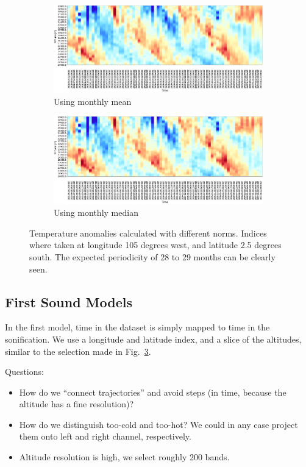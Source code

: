\documentclass[11pt,a4paper]{article}
\newcommand{\figref}[1]{Fig.~\ref{#1}}
\begin{document}
\begin{figure}
\begin{subfigure}[b]{1.0\textwidth}%
\centering
\includegraphics[scale=0.45,trim=2mm 0 1mm 1mm]{figures/ta_anomalies_mean.jpg}
\caption{Using monthly mean}
\label{fig:anomaly-mean}
\end{subfigure}
\begin{subfigure}[b]{1.0\textwidth}%
\centering
\includegraphics[scale=0.45,trim=2mm 0 1mm -4mm]{figures/ta_anomalies_median.jpg}
\caption{Using monthly median}
\label{fig:anomaly-median}
\end{subfigure}
\caption{Temperature anomalies calculated with different norms. Indices where taken at longitude 105 degrees west, and latitude 2.5 degrees south. The expected periodicity of 28 to 29 months can be clearly seen.}
\label{fig:anomaly-calc}
\end{figure}

\subsection{First Sound Models}

In the first model, time in the dataset is simply mapped to time in the sonification. We use a longitude and latitude index, and a slice of the altitudes, similar to the selection made in \figref{fig:anomaly-calc}.

Questions:
%
\begin{itemize}
\item How do we ``connect trajectories'' and avoid steps (in time, because the altitude has a fine resolution)?
\item How do we distinguish too-cold and too-hot? We could in any case project them onto left and right channel, respectively.
\item Altitude resolution is high, we select roughly 200 bands.
\end{itemize}
%
\end{document}
